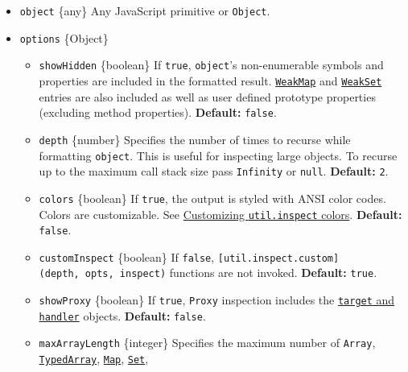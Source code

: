 \begin{itemize}
\tightlist
\item
  \texttt{object} \{any\} Any JavaScript primitive or \texttt{Object}.
\item
  \texttt{options} \{Object\}

  \begin{itemize}
  \tightlist
  \item
    \texttt{showHidden} \{boolean\} If \texttt{true}, \texttt{object}'s
    non-enumerable symbols and properties are included in the formatted
    result.
    \href{https://developer.mozilla.org/en-US/docs/Web/JavaScript/Reference/Global_Objects/WeakMap}{\texttt{WeakMap}}
    and
    \href{https://developer.mozilla.org/en-US/docs/Web/JavaScript/Reference/Global_Objects/WeakSet}{\texttt{WeakSet}}
    entries are also included as well as user defined prototype
    properties (excluding method properties). \textbf{Default:}
    \texttt{false}.
  \item
    \texttt{depth} \{number\} Specifies the number of times to recurse
    while formatting \texttt{object}. This is useful for inspecting
    large objects. To recurse up to the maximum call stack size pass
    \texttt{Infinity} or \texttt{null}. \textbf{Default:} \texttt{2}.
  \item
    \texttt{colors} \{boolean\} If \texttt{true}, the output is styled
    with ANSI color codes. Colors are customizable. See
    \hyperref[customizing-utilinspect-colors]{Customizing
    \texttt{util.inspect} colors}. \textbf{Default:} \texttt{false}.
  \item
    \texttt{customInspect} \{boolean\} If \texttt{false},
    \texttt{{[}util.inspect.custom{]}(depth,\ opts,\ inspect)} functions
    are not invoked. \textbf{Default:} \texttt{true}.
  \item
    \texttt{showProxy} \{boolean\} If \texttt{true}, \texttt{Proxy}
    inspection includes the
    \href{https://developer.mozilla.org/en-US/docs/Web/JavaScript/Reference/Global_Objects/Proxy\#Terminology}{\texttt{target}
    and \texttt{handler}} objects. \textbf{Default:} \texttt{false}.
  \item
    \texttt{maxArrayLength} \{integer\} Specifies the maximum number of
    \texttt{Array},
    \href{https://developer.mozilla.org/en-US/docs/Web/JavaScript/Reference/Global_Objects/TypedArray}{\texttt{TypedArray}},
    \href{https://developer.mozilla.org/en-US/docs/Web/JavaScript/Reference/Global_Objects/Map}{\texttt{Map}},
    \href{https://developer.mozilla.org/en-US/docs/Web/JavaScript/Reference/Global_Objects/Set}{\texttt{Set}},

\end{itemize}
\end{itemize}
